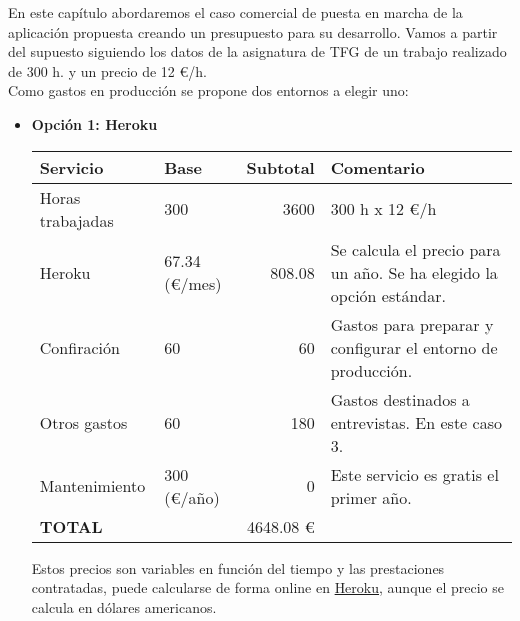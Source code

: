 

En este capítulo abordaremos el caso comercial de puesta en marcha de la aplicación propuesta creando un presupuesto para su desarrollo. Vamos a partir del supuesto siguiendo los datos de la asignatura de TFG de un trabajo realizado de 300 h. y un precio de 12 \euro/h. \\

Como gastos en producción se propone dos entornos a elegir uno:

\begin{itemize}

\item \textbf{Opción 1: Heroku}
\begin{center}
    \begin{tabular}{| l | l | r | p{5cm} |}
    \hline
    Servicio & Base & Subtotal & Comentario \\ \hline
    Horas trabajadas & 300 & 3600 & 300 h x 12 \euro/h \\ \hline
    Heroku & 67.34 (\euro/mes) & 808.08 & Se calcula el precio para un año. Se ha elegido la opción estándar.\\ \hline
    Confiración & 60 & 60 & Gastos para preparar y configurar el entorno de producción. \\ \hline 
    Otros gastos & 60 & 180 & Gastos destinados a entrevistas. En este caso 3. \\ \hline 
    Mantenimiento & 300 (\euro/año) & 0 & Este servicio es gratis el primer año. \\ \hline
    \textbf{TOTAL} &  & 4648.08 \euro &  \\
    \hline
    \end{tabular}
\end{center}

Estos precios son variables en función del tiempo y las prestaciones contratadas, puede calcularse de forma online en \href{https://www.heroku.com/pricing}{Heroku}, aunque el precio se calcula en dólares americanos. 


\end{itemize}
